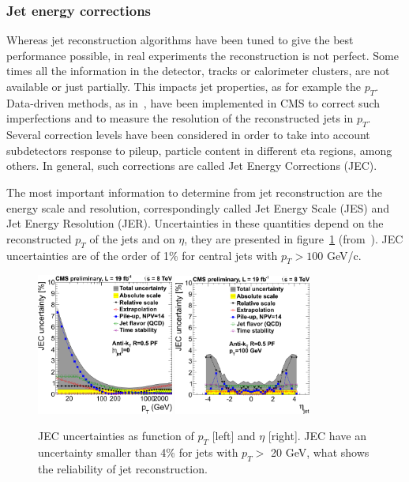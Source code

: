 \subsubsection{Jet energy corrections}

Whereas jet reconstruction algorithms have been tuned to give the best performance possible, in real experiments the reconstruction is not perfect. Some times all the information in the detector, tracks or calorimeter clusters, are not available or just partially. This impacts jet properties, as for example the $p_{T}$. Data-driven methods, as in~\cite{2011JInst...611002C}, have been implemented in CMS to correct such imperfections and to measure the resolution of the reconstructed jets in $p_{T}$. Several correction levels have been considered in order to take into account subdetectors response to pileup, particle content in different eta regions, among others. In general, such corrections are called Jet Energy Corrections (JEC). 

The most important information to determine from jet reconstruction are the energy scale and resolution, correspondingly called Jet Energy Scale (JES) and Jet Energy Resolution (JER). Uncertainties in these quantities depend on the reconstructed $p_{T}$ of the jets and on $\eta$, they are presented in figure~\ref{fig:JEC} (from~\cite{Brochet:1956723}). JEC uncertainties are of the order of 1\% for central jets with $p_{T}>100$ GeV/c.

\begin{figure}[!Hhtbp]
  \begin{center}
    \includegraphics[width=0.4\textwidth]{figs/JEC_pt.png}
    \includegraphics[width=0.4\textwidth]{figs/JEC_eta.png}
    \caption{JEC uncertainties as function of $p_{T}$ [left] and $\eta$ [right]. JEC have an uncertainty smaller than 4\% for jets with $p_{T}>$ 20 GeV, what shows the reliability of jet reconstruction.}
    \label{fig:JEC}
  \end{center}
\end{figure}


